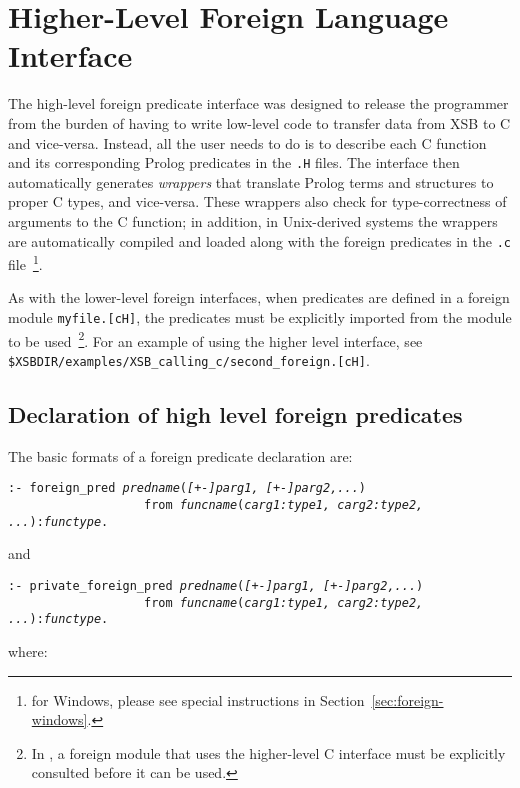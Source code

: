 \section{Higher-Level Foreign Language Interface}

The high-level foreign predicate interface was designed to release the
programmer from the burden of having to write low-level code to
transfer data from XSB to C and vice-versa.  Instead, all the user
needs to do is to describe each C function and its corresponding
Prolog predicates in the {\tt .H} files. The interface then
automatically generates \emph{wrappers} that translate Prolog terms
and structures to proper C types, and vice-versa.  These wrappers also
check for type-correctness of arguments to the C function; in
addition, in Unix-derived systems the wrappers are automatically
compiled and loaded along with the foreign predicates in the {\tt .c}
file~\footnote{for Windows, please see special instructions in
  Section~\ref{sec:foreign-windows}.}.

As with the lower-level foreign interfaces, when predicates are
defined in a foreign module {\verb|myfile.[cH]|}, the predicates must
be explicitly imported from the module to be used~\footnote{In
  \version , a foreign module that uses the higher-level C interface
  must be explicitly consulted before it can be used.}.  For an
example of using the higher level interface, see {\tt
  \$XSBDIR/examples/XSB\_calling\_c/second\_foreign.[cH]}.

\subsection{Declaration of high level foreign predicates}

The basic formats of a foreign predicate declaration are:
\begin{center}
{\tt :- foreign\_pred \emph{predname}(\emph{[+-]parg1,
  [+-]parg2,...})\\
~~~~~~~~~~~~~~~~~~~from \emph{funcname}(\emph{carg1:type1, carg2:type2,
  ...}):\emph{functype}.
}
\end{center}
and
\begin{center}
{\tt :- private\_foreign\_pred \emph{predname}(\emph{[+-]parg1,
  [+-]parg2,...})\\
~~~~~~~~~~~~~~~~~~~from \emph{funcname}(\emph{carg1:type1, carg2:type2,
  ...}):\emph{functype}.
}
\end{center}
where:

